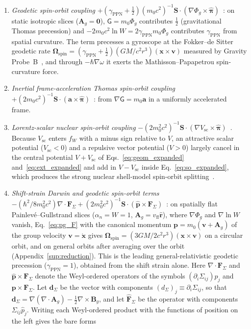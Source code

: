\documentclass[aps,prd,onecolumn,tightenlines,nofootinbib,notitlepage,11pt,floatfix]{revtex4-2}
\theoremstyle{indentedtheorem}
\begin{document}
\begin{enumerate}[label=(\alph*)]
\item \emph{Geodetic spin-orbit coupling} $+(\gamma_\text{PPN}+\tfrac{1}{2})(m_0c^2)^{-1}\mathbf{S}\cdot(\nabla\Phi_g\times\hat{\boldsymbol{\pi}})$~\citep{deSitter1916Einstein,Fokker1920Geodesic,ObukhovSilenkoTeryaev2009Spin,Everitt2011Gravity}: on static isotropic slices ($\mathbf{A}_g=\mathbf{0}$), $\mathsf{G}=m_0\Phi_g$ contributes $\tfrac{1}{2}$ (gravitational Thomas precession) and $-2m_0c^2\ln W = 2\gamma_\text{PPN}m_0\Phi_g$ contributes $\gamma_\text{PPN}$ from spatial curvature. The term precesses a gyroscope at the Fokker--de Sitter geodetic rate $\boldsymbol{\Omega}_\text{spin} = (\gamma_\text{PPN}+\tfrac{1}{2})(GM/c^2r^3)(\mathbf{x}\times\mathbf{v})$ measured by Gravity Probe~B~\citep{Everitt2011Gravity}, and through $-\hbar\nabla\omega$ it exerts the Mathisson--Papapetrou spin-curvature force.
\item \emph{Inertial frame-acceleration Thomas spin-orbit coupling} $+(2m_0c^2)^{-1}\mathbf{S}\cdot(\mathbf{a}\times\hat{\boldsymbol{\pi}})$~\citep{Thomas1926Motion,HehlNi1990Inertial}: from $\nabla\mathsf{G}=m_0\mathbf{a}$ in a uniformly accelerated frame.
\item \emph{Lorentz-scalar nuclear spin-orbit coupling} $-(2m_0^2c^2)^{-1}\mathbf{S}\cdot(\nabla V_\text{sc}\times\hat{\boldsymbol{\pi}})$~\citep{Duerr1956Relativistic,SerotWalecka1986Relativistic}. Because $V_\text{sc}$ enters $f_W$ with a minus sign relative to $V$, an attractive scalar potential ($V_\text{sc}<0$) and a repulsive vector potential ($V>0$) largely cancel in the central potential $V+V_\text{sc}$ of Eqs.~\eqref{eq:geom_expanded} and~\eqref{eq:ext_expanded} and add in $V-V_\text{sc}$ inside Eq.~\eqref{eq:so_expanded}, which produces the strong nuclear shell-model spin-orbit splitting~\citep{SerotWalecka1986Relativistic}.
\item \emph{Shift-strain Darwin and geodetic spin-orbit terms} $-(\hbar^2/8m_0^2c^2)\nabla\cdot\mathbf{F}_\Sigma + (2m_0^2c^2)^{-1}\mathbf{S}\cdot(\hat{\mathbf{p}}\times\mathbf{F}_\Sigma)$~\citep{ObukhovSilenkoTeryaev2011Dirac}: on spatially flat Painlev\'e--Gullstrand slices ($\alpha_n=W=1$, $\mathbf{A}_g = v_\text{ff}\hat{\mathbf{r}}$), where $\nabla\Phi_g$ and $\nabla\ln W$ vanish, Eq.~\eqref{eq:pg_F} with the canonical momentum $\mathbf{p}=m_0(\mathbf{v}+\mathbf{A}_g)$ of the group velocity $\mathbf{v}=\dot{\mathbf{x}}$ gives $\boldsymbol{\Omega}_\text{spin} = (3GM/2c^2r^3)(\mathbf{x}\times\mathbf{v})$ on a circular orbit, and on general orbits after averaging over the orbit (Appendix~\ref{sup:reduction}). This is the leading general-relativistic geodetic precession ($\gamma_\text{PPN}=1$), obtained from the shift strain alone. Here $\nabla\cdot\mathbf{F}_\Sigma$ and $\hat{\mathbf{p}}\times\mathbf{F}_\Sigma$ denote the Weyl-ordered operators of the symbols $(\partial_i\Sigma_{ij})p_j$ and $\mathbf{p}\times\mathbf{F}_\Sigma$. Let $\mathbf{d}_\Sigma$ be the vector with components $(d_\Sigma)_j\equiv\partial_i\Sigma_{ij}$, so that $\mathbf{d}_\Sigma = \nabla(\nabla\cdot\mathbf{A}_g) - \tfrac{1}{2}\nabla\times\mathbf{B}_g$, and let $\hat{\mathbf{F}}_\Sigma$ be the operator with components $\Sigma_{ij}\hat{p}_j$. Writing each Weyl-ordered product with the functions of position on the left gives the bare forms

\end{enumerate}
\end{document}
